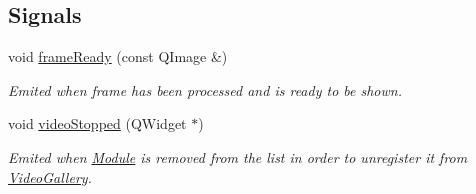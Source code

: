 \subsection*{Signals}
\begin{DoxyCompactItemize}
\item 
void \hyperlink{class_module_a216ad8e0b35bdcc51a37ea40aa3bfdcf}{frameReady} (const QImage \&)
\begin{DoxyCompactList}\small\item\em Emited when frame has been processed and is ready to be shown. \item\end{DoxyCompactList}\item 
void \hyperlink{class_module_abd2a5a79ff77212c6730767dc7d5d49d}{videoStopped} (QWidget $\ast$)
\begin{DoxyCompactList}\small\item\em Emited when \hyperlink{class_module}{Module} is removed from the list in order to unregister it from \hyperlink{class_video_gallery}{VideoGallery}. \item\end{DoxyCompactList}\end{DoxyCompactItemize}

